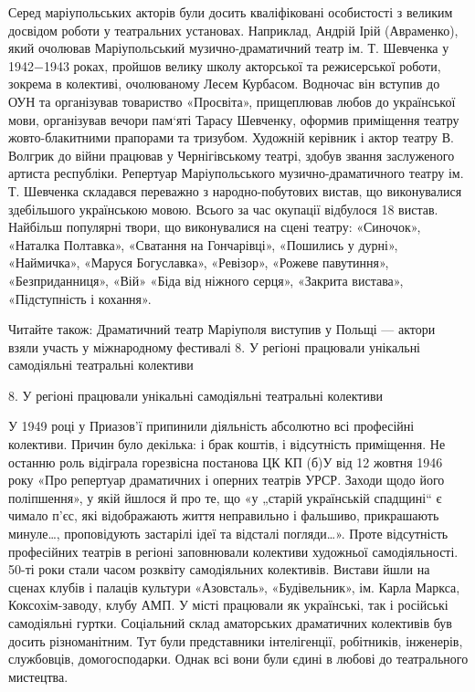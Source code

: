 Серед маріупольських акторів були досить кваліфіковані особистості з великим
досвідом роботи у театральних установах. Наприклад, Андрій Ірій (Авраменко),
який очолював Маріупольський музично-драматичний театр ім. Т. Шевченка у
1942−1943 роках, пройшов велику школу акторської та режисерської роботи,
зокрема в колективі, очолюваному Лесем Курбасом. Водночас він вступив до ОУН та
організував товариство «Просвіта», прищеплював любов до української мови,
організував вечори пам‘яті Тарасу Шевченку, оформив приміщення театру
жовто-блакитними прапорами та тризубом. Художній керівник і актор театру В.
Волгрик до війни працював у Чернігівському театрі, здобув звання заслуженого
артиста республіки. Репертуар Маріупольського музично-драматичного театру ім.
Т. Шевченка складався переважно з народно-побутових вистав, що виконувалися
здебільшого українською мовою. Всього за час окупації відбулося 18 вистав.
Найбільш популярні твори, що виконувалися на сцені театру: «Синочок», «Наталка
Полтавка», «Сватання на Гончарівці», «Пошились у дурні», «Наймичка», «Маруся
Богуславка», «Ревізор», «Рожеве павутиння», «Безприданниця», «Вій» «Біда від
ніжного серця», «Закрита вистава», «Підступність і кохання».

Читайте також: Драматичний театр Маріуполя виступив у Польщі — актори взяли
участь у міжнародному фестивалі 8. У регіоні працювали унікальні самодіяльні
театральні колективи 

8. У регіоні працювали унікальні самодіяльні театральні колективи 

У 1949 році у Приазов'ї припинили діяльність абсолютно всі професійні
колективи. Причин було декілька: і брак коштів, і відсутність приміщення. Не
останню роль відіграла горезвісна постанова ЦК КП (б)У від 12 жовтня 1946 року
«Про репертуар драматичних і оперних театрів УРСР. Заходи щодо його
поліпшення», у якій йшлося й про те, що «у „старій українській спадщині“ є
чимало п'єс, які відображають життя неправильно і фальшиво, прикрашають
минуле…, проповідують застарілі ідеї та відсталі погляди…». Проте відсутність
професійних театрів в регіоні заповнювали колективи художньої самодіяльності.
50-ті роки стали часом розквіту самодіяльних колективів. Вистави йшли на сценах
клубів і палаців культури «Азовсталь», «Будівельник», ім. Карла Маркса,
Коксохім-заводу, клубу АМП. У місті працювали як українські, так і російські
самодіяльні гуртки. Соціальний склад аматорських драматичних колективів був
досить різноманітним. Тут були представники інтелігенції, робітників,
інженерів, службовців, домогосподарки. Однак всі вони були єдині в любові до
театрального мистецтва.

